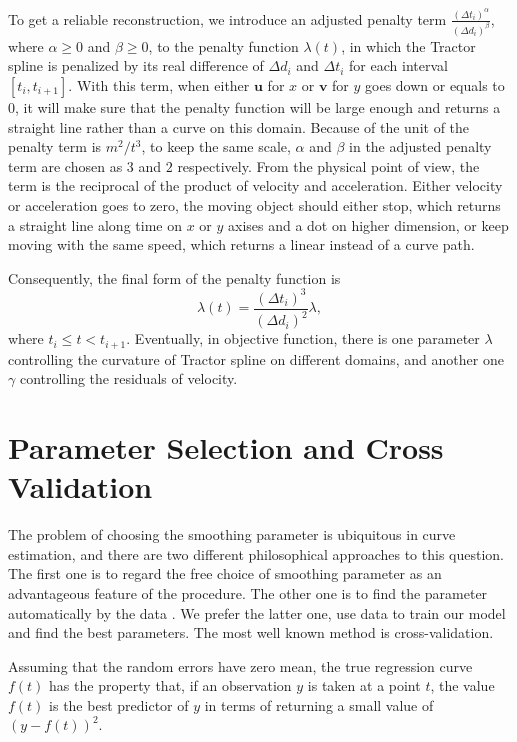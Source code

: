 To get a reliable reconstruction, we introduce an adjusted penalty term $\frac{(\Delta t_i)^\alpha}{(\Delta d_i)^\beta}$, where $\alpha \ge 0$ and $\beta \ge 0$, to the penalty function $\lambda(t)$, in which the Tractor spline is penalized by its real difference of $\Delta d_i$ and $\Delta t_i$ for each interval $[t_i, t_{i+1}]$. With this term, when either $\mathbf{u}$ for $x$ or $\mathbf{v}$ for $y$ goes down or equals to 0, it will make sure that the penalty function will be large enough and returns a straight line rather than a curve on this domain. Because of the unit of the penalty term is $m^2/t^3$, to keep the same scale, $\alpha$ and $\beta$ in the adjusted penalty term are chosen as $3$ and $2$ respectively. From the physical point of view, the term is the reciprocal of the product of velocity and acceleration. Either velocity or acceleration goes to zero, the moving object should either stop, which returns a straight line along time on $x$ or $y$ axises and a dot on higher dimension, or keep moving with the same speed, which returns a linear  instead of a curve path. 

Consequently, the final form of the penalty function is 
\begin{equation}\label{adjustedpenalty}
\lambda(t)=\frac{(\Delta t_i)^3}{(\Delta d_i)^2}\lambda,
\end{equation}
where  $t_i\leq t < t_{i+1}$. Eventually, in objective function, there is one parameter $\lambda$ controlling the curvature of Tractor spline on different domains, and another one $\gamma$ controlling the residuals of velocity. 




\section{Parameter Selection and Cross Validation}

The problem of choosing the smoothing parameter is ubiquitous in curve estimation, and there are two different philosophical approaches to this question. The first one is to regard the free choice of smoothing parameter as an advantageous feature of the procedure. The other one is to find the parameter automatically by the data \cite{green1993nonparametric}. We prefer the latter one, use data to train our model and find the best parameters. The most well known method is cross-validation.


Assuming that the random errors have zero mean, the true regression curve $f(t)$ has the property that, if an observation $y$ is taken at a point $t$, the value $f(t)$ is the best predictor of $y$ in terms of returning a small value of $(y-f(t))^2$. 

